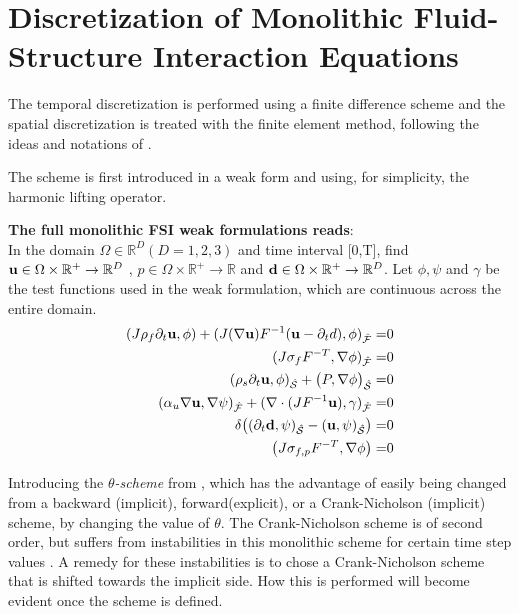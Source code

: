\section{Discretization of Monolithic Fluid-Structure Interaction Equations}\label{Discretization}
The temporal discretization is performed using a finite difference scheme and the spatial discretization is treated with the finite element method, following the ideas and notations of \cite{Wick2011}.

The scheme is first introduced in a weak form and using, for simplicity, the harmonic lifting operator. 

\textbf{The full monolithic FSI weak formulations reads}:\\
In the domain $\Omega \in \mathbb{R}^D (D=1,2,3)$ and time interval [0,T],
find $\bold{u} \in \Omega \times \mathbb{R}^+ \rightarrow \mathbb{R}^D$ , $ p \in \Omega \times \mathbb{R}^+ \rightarrow \mathbb{R}$ and $\bold{d} \in \Omega \times \mathbb{R}^+ \rightarrow \mathbb{R}^D$. Let $\phi, \psi$ and $\gamma$ be the test functions used in the weak formulation, which are continuous across the entire domain.
\begin{align}
   (J \rho_f \partial_t \bold{u} , \phi ) + (J (\nabla \bold{u})F^{-1}(\bold{u} - \partial_t d) , \phi )_{\mathcal{\hat{F}}} =& 0 \label{eq:firsweak} \\
   ( J \sigma_{f} F^{-T} , \nabla \phi )_{\mathcal{\hat{F}}} =& 0\\
   (\rho_s \partial_t \bold{u} , \phi)_{\mathcal{\hat{S}}}   + \big(P, \nabla \phi \big)_{\mathcal{\hat{S}}} =& 0\\
   ( \alpha_u \nabla \bold{u}, \nabla \psi)_{\mathcal{\hat{F}}} + (\nabla \cdot (J F^{-1} \bold{u}),\gamma )_{\mathcal{\hat{F}}} =& 0\\
    \delta\big((\partial_t \bold{d} , \psi)_{\mathcal{\hat{S}}}  - ( \bold{u} , \psi )_{\mathcal{\hat{S}}}\big)=&0       \label{eq:condition} \\ 
    \big( J \sigma_{f,p} F^{-T}, \nabla \phi  \big) =& 0 \label{eq:weak} 	 		
\end{align}

Introducing the \textit{$\theta$-scheme} from \cite{Wick2011}, which has the advantage of easily being changed from a backward (implicit), forward(explicit), or a Crank-Nicholson (implicit) scheme, by changing the value of $\theta$. The Crank-Nicholson scheme is of second order, but suffers from instabilities in this monolithic scheme for certain time step values \cite{Wick2011}. A remedy for these instabilities is to chose a Crank-Nicholson scheme that is shifted towards the implicit side. How this is performed will become evident once the scheme is defined.

